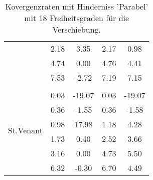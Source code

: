 \begin{table}
\begin{tabular}{c|cc|cc|}
\multicolumn{1}{|c|}{} & \multicolumn{1}{|c|}{      2.18} & \multicolumn{1}{|c|}{      3.35} & \multicolumn{1}{|c|}{      2.17} & \multicolumn{1}{|c|}{      0.98} \\ 
\multicolumn{1}{|c|}{} & \multicolumn{1}{|c|}{      4.74} & \multicolumn{1}{|c|}{      0.00} & \multicolumn{1}{|c|}{      4.76} & \multicolumn{1}{|c|}{      4.41} \\ 
\multicolumn{1}{|c|}{} & \multicolumn{1}{|c|}{      7.53} & \multicolumn{1}{|c|}{     -2.72} & \multicolumn{1}{|c|}{      7.19} & \multicolumn{1}{|c|}{      7.15} \\ 
\hline 
\multicolumn{1}{|c|}{\multirow{7}{*}{St.Venant}} &\multicolumn{1}{|c|}{} & \multicolumn{1}{|c|}{} & \multicolumn{1}{|c|}{} & \multicolumn{1}{|c|}{} \\ 
\multicolumn{1}{|c|}{} & \multicolumn{1}{|c|}{      0.03} & \multicolumn{1}{|c|}{    -19.07} & \multicolumn{1}{|c|}{      0.03} & \multicolumn{1}{|c|}{    -19.07} \\ 
\multicolumn{1}{|c|}{} & \multicolumn{1}{|c|}{      0.36} & \multicolumn{1}{|c|}{     -1.55} & \multicolumn{1}{|c|}{      0.36} & \multicolumn{1}{|c|}{     -1.58} \\ 
\multicolumn{1}{|c|}{} & \multicolumn{1}{|c|}{      0.98} & \multicolumn{1}{|c|}{     17.98} & \multicolumn{1}{|c|}{      1.18} & \multicolumn{1}{|c|}{      4.28} \\ 
\multicolumn{1}{|c|}{} & \multicolumn{1}{|c|}{      1.73} & \multicolumn{1}{|c|}{      0.40} & \multicolumn{1}{|c|}{      2.52} & \multicolumn{1}{|c|}{      3.66} \\ 
\multicolumn{1}{|c|}{} & \multicolumn{1}{|c|}{      3.16} & \multicolumn{1}{|c|}{      0.00} & \multicolumn{1}{|c|}{      4.73} & \multicolumn{1}{|c|}{      5.50} \\ 
\multicolumn{1}{|c|}{} & \multicolumn{1}{|c|}{      6.32} & \multicolumn{1}{|c|}{     -0.30} & \multicolumn{1}{|c|}{      6.70} & \multicolumn{1}{|c|}{      4.49} \\ 
\hline 
\end{tabular}\caption{Kovergenzraten mit Hinderniss 'Parabel' mit 18 Freiheitsgraden für die Verschiebung.}\label{tab:Rate_Parabel_level0}
\end{table} 
